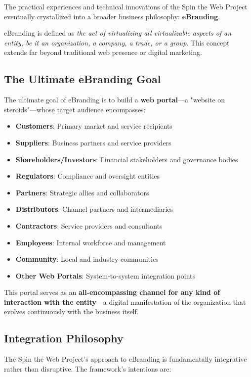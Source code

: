 The practical experiences and technical innovations of the Spin the Web Project eventually crystallized into a broader business philosophy: \textbf{eBranding}.

eBranding is defined as \textit{the act of virtualizing all virtualizable aspects of an entity, be it an organization, a company, a trade, or a group}. This concept extends far beyond traditional web presence or digital marketing.

\subsection{The Ultimate eBranding Goal}

The ultimate goal of eBranding is to build a \textbf{web portal}—a "website on steroids"—whose target audience encompasses:

\begin{itemize}
\item \textbf{Customers}: Primary market and service recipients
\item \textbf{Suppliers}: Business partners and service providers
\item \textbf{Shareholders/Investors}: Financial stakeholders and governance bodies
\item \textbf{Regulators}: Compliance and oversight entities
\item \textbf{Partners}: Strategic allies and collaborators
\item \textbf{Distributors}: Channel partners and intermediaries
\item \textbf{Contractors}: Service providers and consultants
\item \textbf{Employees}: Internal workforce and management
\item \textbf{Community}: Local and industry communities
\item \textbf{Other Web Portals}: System-to-system integration points
\end{itemize}

This portal serves as an \textbf{all-encompassing channel for any kind of interaction with the entity}—a digital manifestation of the organization that evolves continuously with the business itself.

\subsection{Integration Philosophy}

The Spin the Web Project's approach to eBranding is fundamentally integrative rather than disruptive. The framework's intentions are:

